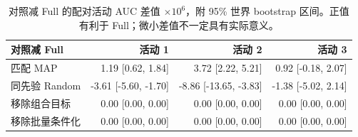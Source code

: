 \begin{table}[H]
\centering
\caption{对照减 Full 的配对活动 AUC 差值 $\times10^6$，附 95\% 世界 bootstrap 区间。正值有利于 Full；微小差值不一定具有实际意义。}
\label{tab:paired}
\scriptsize
\setlength{\tabcolsep}{3pt}
\begin{tabular}{lrrr}
\toprule
对照减 Full & 活动 1 & 活动 2 & 活动 3 \\
\midrule
匹配 MAP & 1.19 [0.62, 1.84] & 3.72 [2.22, 5.21] & 0.92 [-0.18, 2.07] \\
同先验 Random & -3.61 [-5.60, -1.70] & -8.86 [-13.65, -3.83] & -1.38 [-5.02, 2.14] \\
移除组合目标 & 0.00 [0.00, 0.00] & 0.00 [0.00, 0.00] & 0.00 [0.00, 0.00] \\
移除批量条件化 & 0.00 [0.00, 0.00] & 0.00 [0.00, 0.00] & 0.00 [0.00, 0.00] \\
\bottomrule
\end{tabular}
\end{table}
